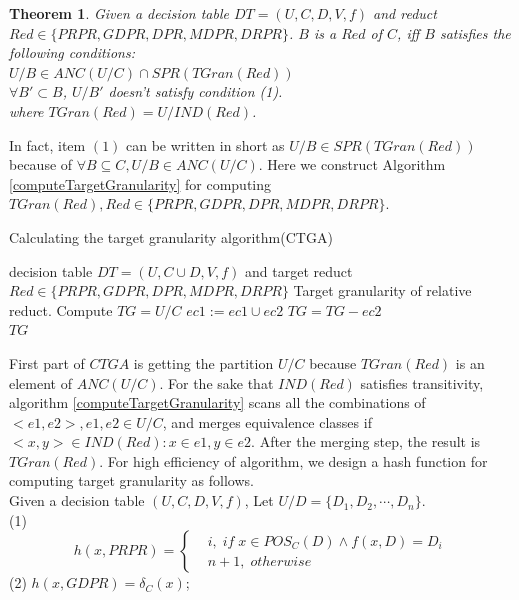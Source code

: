 \documentclass[review]{elsarticle}
\newtheorem{myTheo}{Theorem}
\begin{document}
		\begin{myTheo}\label{generalReduct}
			Given a decision table $DT=(U,C,D,V,f)$ and reduct $Red \in \{PRPR, GDPR, DPR, MDPR, DRPR\}$. $B$ is a $Red$ of $C$, iff $B$ satisfies the following conditions:
			\\ $U/B \in ANC(U/C) \cap SPR(TGran(Red))$
			\\ $\forall B' \subset B$, $U/B'$ doesn't satisfy condition (1).\\
			where $TGran(Red)=U/IND(Red)$.
		\end{myTheo}
		 In fact, item $(1)$ can be written in short as $U/B \in SPR(TGran(Red))$ because of $\forall B \subseteq C, U/B \in ANC(U/C)$. Here we construct Algorithm \ref{computeTargetGranularity} for computing $TGran(Red), Red \in \{PRPR, GDPR, DPR, MDPR, DRPR\}$.
		\begin{algorithm}[htb]
			\caption{Calculating the target granularity algorithm(CTGA)}
			\label{computeTargetGranularity}
			\begin{algorithmic}[1]
				\Require decision table $DT=(U, C \cup D,V,f)$ and target reduct $Red \in \{PRPR,GDPR,DPR,MDPR,DRPR\}$
				\Ensure Target granularity of relative reduct.
				\State Compute $TG=U/C$
				\State $ec1:=ec1 \cup ec2$
				\State $TG=TG-ec2$
				\EndIf
				\EndFor
				\EndFor\\
				\Return $TG$
			\end{algorithmic}
		\end{algorithm}
		First part of $CTGA$ is getting the partition $U/C$ because $TGran(Red)$ is an element of $ANC(U/C)$. For the sake that $IND(Red)$ satisfies transitivity, algorithm \ref{computeTargetGranularity} scans all the combinations of $<e1,e2>, e1,e2 \in U/C$, and merges equivalence classes if $<x,y>\in IND(Red): x \in e1,y \in e2$. After the merging step, the result is $TGran(Red)$. For high efficiency of algorithm, we design a hash function for computing target granularity as follows.\\
		Given a decision table $(U,C,D,V,f)$, Let $U/D=\{D_1,D_2,\cdots,D_n\}$.\\
		{\rm(1)} $$ h(x,PRPR)=\left \{ \begin{aligned}&i ,\; if \; x \in POS_C(D) \wedge f(x,D)=D_i\\ &n+1 ,\; otherwise \end{aligned} \right. $$
		{\rm(2)} $h(x,GDPR)=\delta_C(x)$;\\
\end{document}
